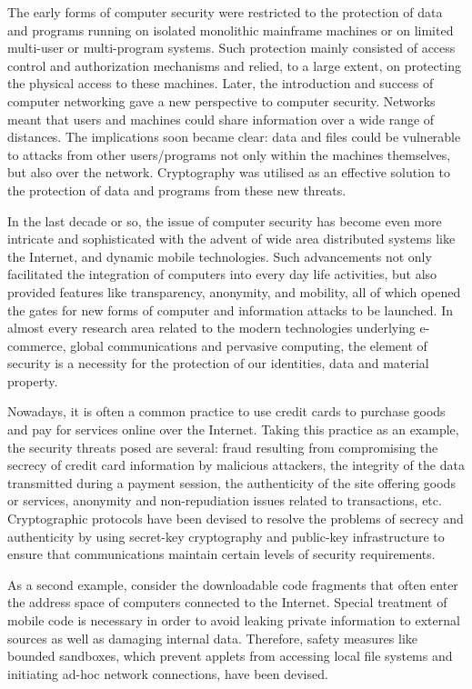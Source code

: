 \documentclass[10pt,a4paper,final,oneside,fleqn]{book}
\begin{document}
The early forms of computer security were restricted to the protection of data and programs running on isolated monolithic mainframe machines or on limited multi-user or multi-program systems.  Such protection mainly consisted of access control and authorization mechanisms and relied, to a large extent, on protecting the physical access to these machines.  Later, the introduction and success of computer networking gave a new perspective to computer security.  Networks meant that users and machines could share information over a wide range of distances.  The implications soon became clear: data and files could be vulnerable to attacks from other users/programs not only within the machines themselves, but also over the network. Cryptography was utilised as an effective solution to the protection of data and programs from these new threats.

In the last decade or so, the issue of computer security has become even more intricate and sophisticated with the advent of wide area distributed systems like the Internet, and dynamic mobile technologies.  Such advancements not only facilitated the integration of computers into every day life activities, but also provided features like transparency, anonymity, and mobility, all of which opened the gates for new forms of computer and information attacks to be launched.  In almost every research area related to the modern technologies underlying e-commerce, global communications and pervasive computing, the element of security is a necessity for the protection of our identities, data and material property.

Nowadays, it is often a common practice to use credit cards to purchase goods and pay for services online over the Internet.  Taking this practice as an example, the security threats posed are several: fraud resulting from compromising the secrecy of credit card information by malicious attackers, the integrity of the data transmitted during a payment session, the authenticity of the site offering goods or services, anonymity and non-repudiation issues related to transactions, etc.  Cryptographic protocols have been devised to resolve the problems of secrecy and authenticity by using secret-key cryptography and public-key infrastructure to ensure that communications maintain certain levels of security requirements.

As a second example, consider the downloadable code fragments that often enter the address space of computers connected to the Internet.  Special treatment of mobile code is necessary in order to avoid leaking private information to external sources as well as damaging internal data.  Therefore, safety measures like bounded sandboxes, which prevent applets from accessing local file systems and initiating ad-hoc network connections, have been devised.
\end{document}
